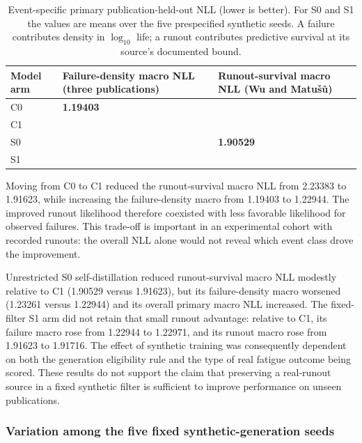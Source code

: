 \documentclass[12pt,a4paper]{article}
\begin{document}
\begin{table}[!htbp]
\centering
\caption{Event-specific primary publication-held-out NLL (lower is better). For S0 and S1 the values are means over the five prespecified synthetic seeds. A failure contributes density in \(\log_{10}\) life; a runout contributes predictive survival at its source's documented bound.}
\label{tab:3}
\begingroup
\scriptsize
\setlength{\tabcolsep}{3pt}
\renewcommand{\arraystretch}{1.22}
\begin{tabularx}{\linewidth}{>{\raggedright\arraybackslash}X>{\raggedright\arraybackslash}X>{\raggedright\arraybackslash}X}
\toprule
Model arm & Failure-density macro NLL (three publications) & Runout-survival macro NLL (Wu and Matušů) \\ \midrule
C0 & \textbf{1.19403} & 2.23383 \\
C1 & 1.22944 & 1.91623 \\
S0 & 1.23261 & \textbf{1.90529} \\
S1 & 1.22971 & 1.91716 \\
\bottomrule
\end{tabularx}
\endgroup
\end{table}
\FloatBarrier

Moving from C0 to C1 reduced the runout-survival macro NLL from 2.23383 to 1.91623, while increasing the failure-density macro from 1.19403 to 1.22944. The improved runout likelihood therefore coexisted with less favorable likelihood for observed failures. This trade-off is important in an experimental cohort with recorded runouts: the overall NLL alone would not reveal which event class drove the improvement.

Unrestricted S0 self-distillation reduced runout-survival macro NLL modestly relative to C1 (1.90529 versus 1.91623), but its failure-density macro worsened (1.23261 versus 1.22944) and its overall primary macro NLL increased. The fixed-filter S1 arm did not retain that small runout advantage: relative to C1, its failure macro rose from 1.22944 to 1.22971, and its runout macro rose from 1.91623 to 1.91716. The effect of synthetic training was consequently dependent on both the generation eligibility rule and the type of real fatigue outcome being scored. These results do not support the claim that preserving a real-runout source in a fixed synthetic filter is sufficient to improve performance on unseen publications.

\subsubsection{Variation among the five fixed synthetic-generation seeds}
\end{document}
